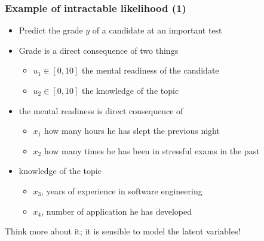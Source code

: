 \begin{frame}
  \frametitle{Example of intractable likelihood (1)}
\begin{itemize}
  \item Predict the grade $y$ of a candidate at an important test
  \item Grade is a direct consequence of two things
  \begin{itemize}
    \item $u_1 \in [0,10]$ the mental readiness of the candidate
    \item $u_2 \in [0,10]$ the knowledge of the topic
  \end{itemize}
\item the mental readiness is direct consequence of
  \begin{itemize}
  \item $x_1$ how many hours he has slept the previous night
  \item $x_2$ how many times he has been in stressful exams in the past
  \end{itemize}
\item knowledge of the topic
  \begin{itemize}
  \item $x_3$, years of experience in software engineering
  \item $x_4$, number of application he has developed
  \end{itemize}
\end{itemize}
  \noindent\makebox[\linewidth]{\rule{\paperwidth}{0.4pt}}
  Think more about it; \alert{it is sensible to model the latent variables!}
\end{frame}


